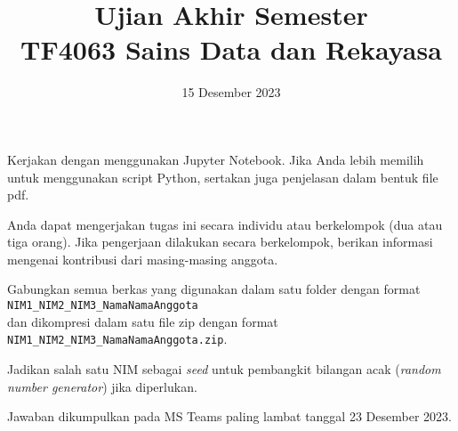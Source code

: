 \documentclass[a4paper,11pt]{article} %
\begin{document}
\title{Ujian Akhir Semester \\
TF4063 Sains Data dan Rekayasa}
\author{}
\date{15 Desember 2023}
\maketitle


Kerjakan dengan menggunakan Jupyter Notebook.
Jika Anda lebih memilih untuk menggunakan
script Python, sertakan juga penjelasan dalam bentuk file pdf.

Anda dapat mengerjakan tugas ini secara individu atau berkelompok (dua atau tiga orang).
Jika pengerjaan dilakukan secara berkelompok, berikan informasi mengenai kontribusi dari
masing-masing anggota.

Gabungkan semua berkas yang digunakan dalam satu folder dengan format\\
\texttt{NIM1\_NIM2\_NIM3\_NamaNamaAnggota}\\
dan dikompresi dalam satu file zip dengan format\\
\texttt{NIM1\_NIM2\_NIM3\_NamaNamaAnggota.zip}.

Jadikan salah satu NIM sebagai \textit{seed} untuk pembangkit bilangan acak
(\textit{random number generator}) jika diperlukan.

Jawaban dikumpulkan pada MS Teams paling lambat tanggal 23 Desember 2023.
\end{document}
